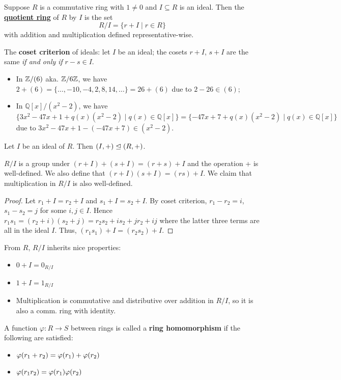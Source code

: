 \documentclass[12pt]{article}
\begin{document}
 Suppose $R$ is a commutative ring with $1\neq 0$ and $I\subseteq R$ is an ideal. Then the \underline{\textbf{quotient ring}} of $R$ by $I$ is the set $$R/I=\{r+I\mid r\in R\}$$ with addition and multiplication defined representative-wise.

\rmk The \textbf{coset criterion} of ideals: let $I$ be an ideal; the cosets $r+I$, $s+I$ are the same \textit{if and only if} $r-s\in I$.

\eg \hfill
\begin{itemize}
    \item In $\mathbb{Z}/(6)$ aka. $\mathbb{Z\text{/6}Z}$, we have $2+(6)=\{\dots,-10,-4,2,8,14,\dots\} = 26+(6)$ due to $2-26\in (6)$;
    \item In $\mathbb{Q}[x]/(x^2-2)$, we have $$\{3x^2-47x+1+q(x)(x^2-2)\mid q(x)\in \mathbb{Q}[x]\} = \{-47x+7+q(x)(x^2-2)\mid q(x)\in \mathbb{Q}[x]\}$$ due to $3x^2-47x+1-(-47x+7)\in (x^2-2)$.
\end{itemize}

\rmk Let $I$ be an ideal of $R$. Then \underline{$(I,+)\trianglelefteq (R,+)$}. 

 $R/I$ is a group under $(r+I)+(s+I)=(r+s)+I$ and the operation + is well-defined. We also define that $(r+I)(s+I)=(rs)+I$. We claim that multiplication in $R/I$ is also well-defined.
\begin{proof}
    Let $r_1+I=r_2+I$ and $s_1+I=s_2+I$. By coset criterion, $r_1-r_2=i$, $s_1-s_2=j$ for some $i,j\in I$. Hence $r_1s_1=(r_2+i)(s_2+j)=r_2s_2+is_2+jr_2+ij$ where the latter three terms are all in the ideal $I$. Thus, $(r_1s_1)+I=(r_2s_2)+I$.
\end{proof}

From $R$, $R/I$ inherits nice properties:
\begin{itemize}
    \item $0+I=0_{R/I}$
    \item $1+I=1_{R/I}$
    \item Multiplication is commutative and distributive over addition in $R/I$, so it is also a comm. ring with identity.
\end{itemize}

 A function $\varphi: R\rightarrow S$ between rings is called a \textbf{ring homomorphism} if the following are satisfied:
\begin{itemize}
    \item $\varphi (r_1+r_2)=\varphi (r_1)+\varphi (r_2)$
    \item $\varphi (r_1r_2)=\varphi (r_1)\varphi (r_2)$
\end{itemize}
\end{document}
